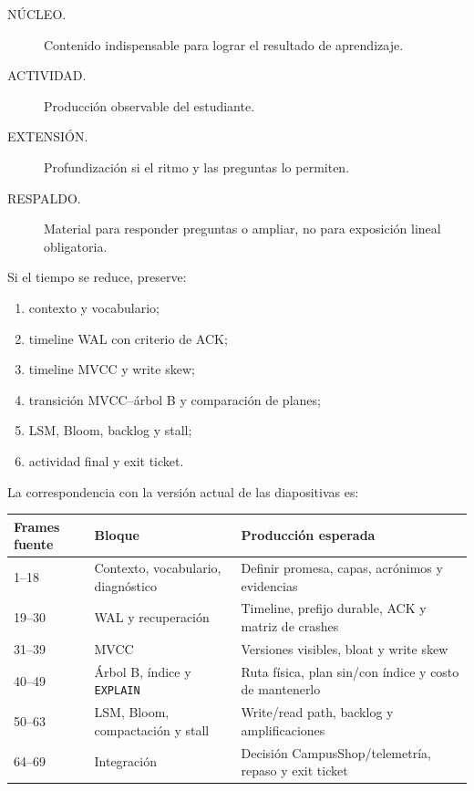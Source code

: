 \documentclass[variant=docente,cover=institutional,mode=screen]{ua-engineering-v6-article}
\begin{document}
\begin{description}
\item[NÚCLEO.] Contenido indispensable para lograr el resultado de aprendizaje.
\item[ACTIVIDAD.] Producción observable del estudiante.
\item[EXTENSIÓN.] Profundización si el ritmo y las preguntas lo permiten.
\item[RESPALDO.] Material para responder preguntas o ampliar, no para exposición lineal obligatoria.
\end{description}

Si el tiempo se reduce, preserve:

\begin{enumerate}
\item contexto y vocabulario;
\item timeline WAL con criterio de ACK;
\item timeline MVCC y write skew;
\item transición MVCC--árbol B y comparación de planes;
\item LSM, Bloom, backlog y stall;
\item actividad final y exit ticket.
\end{enumerate}

La correspondencia con la versión actual de las diapositivas es:

\begin{center}
\small
\begin{tabular}{p{}p{}p{}}
\toprule
Frames fuente & Bloque & Producción esperada \\
\midrule
1--18 & Contexto, vocabulario, diagnóstico & Definir promesa, capas, acrónimos y evidencias \\
19--30 & WAL y recuperación & Timeline, prefijo durable, ACK y matriz de crashes \\
31--39 & MVCC & Versiones visibles, bloat y write skew \\
40--49 & Árbol B, índice y \texttt{EXPLAIN} & Ruta física, plan sin/con índice y costo de mantenerlo \\
50--63 & LSM, Bloom, compactación y stall & Write/read path, backlog y amplificaciones \\
64--69 & Integración & Decisión CampusShop/telemetría, repaso y exit ticket \\
\bottomrule
\end{tabular}
\end{center}
\end{document}
